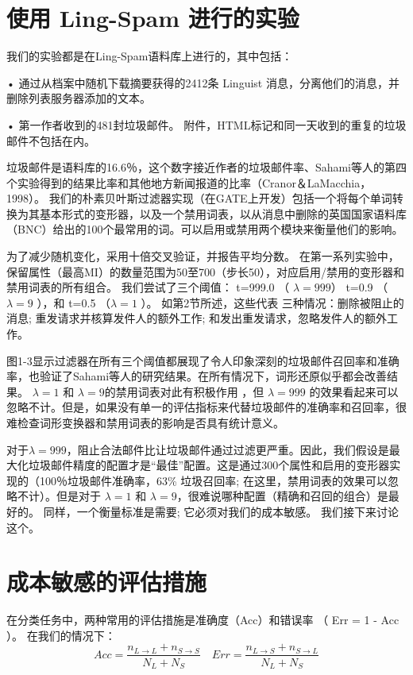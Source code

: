 \documentclass[UTF8]{ctexart}
\begin{document}
\section{使用 Ling-Spam 进行的实验}
我们的实验都是在Ling-Spam语料库上进行的，其中包括：

• 通过从档案中随机下载摘要获得的2412条 Linguist 消息，分离他们的消息，并删除列表服务器添加的文本。

• 第一作者收到的481封垃圾邮件。 附件，HTML标记和同一天收到的重复的垃圾邮件不包括在内。

垃圾邮件是语料库的16.6％，这个数字接近作者的垃圾邮件率、Sahami等人的第四个实验得到的结果比率和其他地方新闻报道的比率（Cranor＆LaMacchia，1998）。
我们的朴素贝叶斯过滤器实现（在GATE上开发）包括一个将每个单词转换为其基本形式的变形器，以及一个禁用词表，以从消息中删除的英国国家语料库（BNC）给出的100个最常用的词。可以启用或禁用两个模块来衡量他们的影响。

为了减少随机变化，采用十倍交叉验证，并报告平均分数。 在第一系列实验中，保留属性（最高MI）的数量范围为50至700（步长50），对应启用/禁用的变形器和禁用词表的所有组合。 我们尝试了三个阈值： t=999.0  （ $\lambda=999 $） t=0.9 （ $\lambda=9$ ），和 t=0.5 （$\lambda=1$ ）。 如第2节所述，这些代表 三种情况：删除被阻止的消息; 重发请求并核算发件人的额外工作; 和发出重发请求，忽略发件人的额外工作。

图1-3显示过滤器在所有三个阈值都展现了令人印象深刻的垃圾邮件召回率和准确率，也验证了Sahami等人的研究结果。在所有情况下，词形还原似乎都会改善结果。 $\lambda=1$ 和  $\lambda=9$的禁用词表对此有积极作用 ，但 $\lambda =999$ 的效果看起来可以忽略不计。但是，如果没有单一的评估指标来代替垃圾邮件的准确率和召回率，很难检查词形变换器和禁用词表的影响是否具有统计意义。

对于$ \lambda=999$，阻止合法邮件比让垃圾邮件通过过滤更严重。因此，我们假设是最大化垃圾邮件精度的配置才是“最佳”配置。这是通过300个属性和启用的变形器实现的（100％垃圾邮件准确率，63\% 垃圾召回率; 在这里，禁用词表的效果可以忽略不计）。但是对于 $\lambda=1$ 和 $\lambda=9$，很难说哪种配置（精确和召回的组合）是最好的。 同样，一个衡量标准是需要; 它必须对我们的成本敏感。 我们接下来讨论这个。

\section{成本敏感的评估措施}
在分类任务中，两种常用的评估措施是准确度（Acc）和错误率 （ Err = 1 - Acc ）。 在我们的情况下：$$Acc=\frac{n_{L \rightarrow L}+n_{S \rightarrow S}}{N_{L}+N_{S}} \quad E r r=\frac{n_{L \rightarrow S}+n_{S \rightarrow L}}{N_{L}+N_{S}}$$
\end{document}
